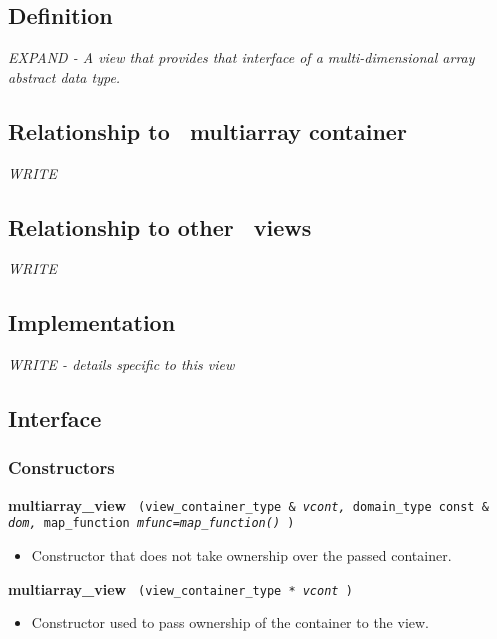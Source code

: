 \subsection{Definition}

\textit{EXPAND - A view that provides that interface of a multi-dimensional array abstract data type.}

\subsection{Relationship to \stapl\ multiarray container}

\textit{WRITE}

\subsection{Relationship to other \stapl\ views}

\textit{WRITE}

\subsection{Implementation}

\textit{WRITE - details specific to this view}

\subsection{Interface} \label{sec-multi-vw-inter}

\subsubsection{Constructors}

\noindent
\textbf{multiarray\_view}%
\texttt{%
(view\_container\_type \&
\textit{vcont,}%
domain\_type const \&
\textit{dom,}%
map\_function
\textit{mfunc=map\_function()}%
)
}

\begin{itemize}
\item
Constructor that does not take ownership over the passed container.
\end{itemize}

\noindent
\textbf{multiarray\_view}%
\texttt{%
(view\_container\_type *
\textit{vcont}%
)
}

\begin{itemize}
\item
Constructor used to pass ownership of the container to the view.
\end{itemize}

